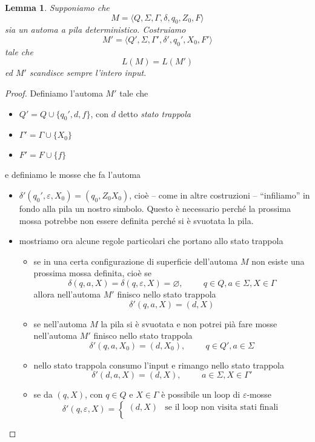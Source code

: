 \documentclass[12pt]{report}
\newtheorem{lemma}{Lemma}
\theoremstyle{definition}
\begin{document}
\begin{lemma}
	Supponiamo che
	$$ M = \langle Q, \Sigma, \Gamma, \delta, q_0, Z_0, F \rangle $$
	sia un automa a pila deterministico.
	Costruiamo 
	$$ M' = \langle Q', \Sigma, \Gamma', \delta', q_0', X_0, F' \rangle $$
	tale che
	$$ L(M) = L(M') $$
	ed $M'$ scandisce sempre l'intero input.
\end{lemma}
\begin{proof}
	Definiamo l'automa $M'$ tale che
	\begin{itemize}
		\item $Q' = Q \cup \{q_0', d, f \}$, con $d$ detto \textit{stato trappola}
		\item $\Gamma' = \Gamma \cup \{X_0\} $
		\item $F' = F \cup \{ f \} $
	\end{itemize}
	e definiamo le mosse che fa l'automa
	\begin{itemize}
		\item $\delta'(q_0', \varepsilon, X_0) = (q_0, Z_0X_0)$, cioè -- come in altre costruzioni -- ``infiliamo'' in fondo alla pila un nostro simbolo.
			Questo è necessario perché la prossima mossa potrebbe non essere definita perché si è svuotata la pila.
		\item mostriamo ora alcune regole particolari che portano allo stato trappola
			\begin{itemize}
				\item se in una certa configurazione di superficie dell'automa $M$ non esiste una prossima mossa definita, cioè se
					$$\delta(q, a, X) = \delta(q, \varepsilon, X) = \varnothing, \hspace{1cm} q \in Q, a \in \Sigma, X \in \Gamma$$
					allora nell'automa $M'$ finisco nello stato trappola
					$$\delta'(q, a, X) = (d, X)$$
				\item se nell'automa $M$ la pila si è svuotata e non potrei pià fare mosse nell'automa $M'$ finisco nello stato trappola
					$$\delta'(q, a, X_0) = (d, X_0),\hspace{1cm}q \in Q', a \in \Sigma$$
				\item nello stato trappola consumo l'input e rimango nello stato trappola
					$$\delta'(d, a, X) = (d, X),\hspace{1cm}a \in \Sigma, X \in \Gamma'$$
				\item se da $(q, X)$, con $q \in Q$ e $X \in \Gamma$ è possibile un loop di $\varepsilon$-mosse
					$$\delta'(q, \varepsilon, X) = 
					\begin{cases}
						(d, X) & \text{se il loop non visita stati finali} \\

\end{cases}$$
\end{itemize}
\end{itemize}
\end{proof}
\end{document}
